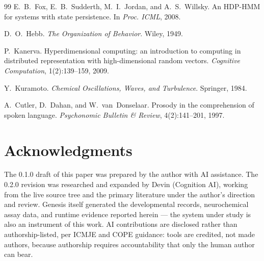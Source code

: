 \documentclass[11pt]{article}
\begin{document}
\begin{thebibliography}{99}
 E.~B.~Fox, E.~B.~Sudderth, M.~I.~Jordan, and
A.~S.~Willsky. An HDP-HMM for systems with state persistence. In
\emph{Proc. ICML}, 2008.

 D.~O.~Hebb. \emph{The Organization of Behavior}. Wiley,
1949.

 P.~Kanerva. Hyperdimensional computing: an
introduction to computing in distributed representation with
high-dimensional random vectors. \emph{Cognitive Computation},
1(2):139--159, 2009.

 Y.~Kuramoto. \emph{Chemical Oscillations, Waves, and
Turbulence}. Springer, 1984.

 A.~Cutler, D.~Dahan, and W.~van~Donselaar. Prosody in
the comprehension of spoken language. \emph{Psychonomic Bulletin \&
Review}, 4(2):141--201, 1997.

\end{thebibliography}

\section*{Acknowledgments}
The 0.1.0 draft of this paper was prepared by the author with AI
assistance. The 0.2.0 revision was researched and expanded by Devin
(Cognition AI), working from the live source tree and the primary
literature under the author's direction and review. Genesis itself
generated the developmental records, neurochemical assay data, and
runtime evidence reported herein --- the system under study is also
an instrument of this work. AI contributions are disclosed rather
than authorship-listed, per ICMJE and COPE guidance: tools are
credited, not made authors, because authorship requires
accountability that only the human author can bear.
\end{document}

